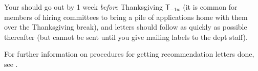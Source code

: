 \documentclass{econtex}
\begin{document}
\begin{enumerate}
\begin{comment}   %
Many schools are now accepting letters by email rather than snail
mail.  Nonetheless, often email addresses do not work.  Therefore the
procedure is as follows.  First, compile a list of employers accepting
letters by email, with the appropriate email addresses.  Separately,
you must supply an envelope with the appropriate address on it (these
can be generated using the \texttt{EmployersMoniker.xls} spreadsheet
which you should customize to, e.g.,
\texttt{EmployersArbatliEC.xls}; but please do NOT customize the columns of 
the \texttt{EmployersMoniker.xls} spreadsheet -- this will make it more difficult
for you in generating your letters as well as for the JMPO when trying to figure
out who has applied where).  You must give a printed copy of
your spreadsheet to the office staff, because they will use these
physical paper copies to keep track of their progress in sending out
the letters.  The office will try sending the letters by email.  If
that fails (wrong email addresses are VERY common), the office will
send letters by snail mail.  {\it The department will cover postage on
  any such letters.}  Finally, provide a separate set of envelopes for
the employers who only accept letters by mail.  Your adviser may also
want you to separate potential employers into academic and
non-academic categories; if so, provide separate sets of envelopes for
these categories.
\end{comment}
  
  Your {\Acorns} should go out by 1 week {\it before} Thanksgiving $\mathsf{T}_{-1w}$ (it is
  common for members of hiring committees to bring a pile of applications
  home with them over the Thanksgiving break), and letters should
  follow as quickly as possible thereafter (but cannot be sent until
  you give mailing labels to the dept staff).  

For further information on procedures for getting recommendation letters done, see \recLet.

\begin{comment} %
\item In October and November, a few major employers (IMF, the Fed)
  may schedule preliminary interviews on campus with Hopkins
  students.\footnote{In recent years, these employers seem to have
    reduced or eliminated their campus visits - not just to Hopkins, but in general.
    Don't be disturbed if no Hopkins visit is scheduled.}  Note that
  the IMF tends to like to draw up their list of interviewees themselves
a week or two before they come to campus, which can be problematic
because sometimes they want to do the interviews before the deadline
for deciding whether you are on the market.  This is one of the many
annoying things about the IMF's job application process, because you
may need to make a judgment about applying to the IMF earlier than a
general judgment about whether to be on the market.  However, if you
change your mind after the interview you can withdraw your application
(at some unknown expected cost to your chances for reapplying next
year).
\end{comment} 


\end{enumerate}
\end{document}
